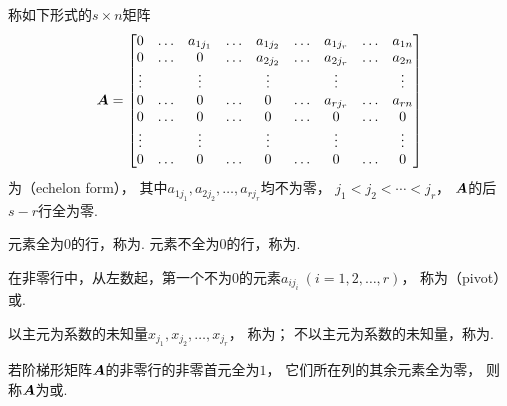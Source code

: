 \begin{definition}
称如下形式的\(s \times n\)矩阵\begin{equation*}
	\boldsymbol{A} = \begin{bmatrix}
		0 & \dots & a_{1 j_1} & \dots & a_{1 j_2} & \dots & a_{1 j_r} & \dots & a_{1n} \\
		0 & \dots & 0 & \dots & a_{2 j_2} & \dots & a_{2 j_r} & \dots & a_{2n} \\
		\vdots & & \vdots & & \vdots & & \vdots & & \vdots \\
		0 & \dots & 0 & \dots & 0 & \dots & a_{r j_r} & \dots & a_{rn} \\
		0 & \dots & 0 & \dots & 0 & \dots & 0 & \dots & 0 \\
		\vdots & & \vdots & & \vdots & & \vdots & & \vdots \\
		0 & \dots & 0 & \dots & 0 & \dots & 0 & \dots & 0 \\
	\end{bmatrix}
\end{equation*}为（echelon form），
其中\(a_{1 j_1},a_{2 j_2},\dotsc,a_{r j_r}\)均不为零，
\(j_1 < j_2 < \dotsb < j_r\)，
\(\boldsymbol{A}\)的后\(s-r\)行全为零.

元素全为\(0\)的行，称为.
元素不全为\(0\)的行，称为.

在非零行中，从左数起，第一个不为\(0\)的元素\(a_{i j_i}\ (i=1,2,\dotsc,r)\)，
称为（pivot）或.

以主元为系数的未知量\(x_{j_1},x_{j_2},\dotsc,x_{j_r}\)，
称为；
不以主元为系数的未知量，称为.
\end{definition}

\begin{definition}
若阶梯形矩阵\(\boldsymbol{A}\)的非零行的非零首元全为\(1\)，
它们所在列的其余元素全为零，
则称\(\boldsymbol{A}\)为或.
\end{definition}

